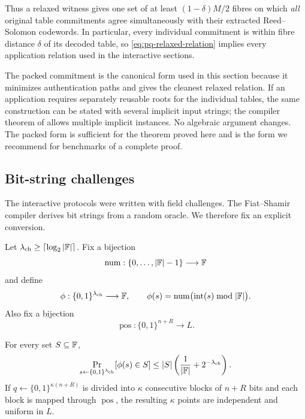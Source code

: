 Thus a relaxed witness gives one set of at least $(1-\delta)M/2$ fibres on which \emph{all} original table commitments agree simultaneously with their extracted Reed--Solomon codewords.  In particular, every individual commitment is within fibre distance $\delta$ of its decoded table, so \cref{eq:pq-relaxed-relation} implies every application relation used in the interactive sections.

\begin{remark}
\label{rem:pq-separate-roots}
The packed commitment is the canonical form used in this section because it minimizes authentication paths and gives the cleanest relaxed relation.  If an application requires separately reusable roots for the individual tables, the same construction can be stated with several implicit input strings; the compiler theorem of \cite{CDHZ25} allows multiple implicit instances.  No algebraic argument changes.  The packed form is sufficient for the theorem proved here and is the form we recommend for benchmarks of a complete proof.
\end{remark}

\subsection{Bit-string challenges}
\label{sec:pq-bit-challenges}

The interactive protocols were written with field challenges.  The Fiat--Shamir compiler derives bit strings from a random oracle.  We therefore fix an explicit conversion.

Let $\lambda_{\mathrm{ch}}\ge \lceil\log_2|\mathbb{F}|\rceil$.  Fix a bijection
\[
  \operatorname{num}:\{0,\ldots,|\mathbb{F}|-1\}\longrightarrow\mathbb{F}
\]
and define
\[
  \phi:\{0,1\}^{\lambda_{\mathrm{ch}}}\longrightarrow\mathbb{F},
  \qquad
  \phi(s)=\operatorname{num}\bigl(\operatorname{int}(s)\bmod|\mathbb{F}|\bigr).
\]
Also fix a bijection
\[
  \operatorname{pos}:\{0,1\}^{n+R}\longrightarrow L.
\]

\begin{lemma}
\label{lem:pq-sampling}
For every set $S\subseteq\mathbb{F}$,
\begin{equation}
  \Pr_{s\leftarrow\{0,1\}^{\lambda_{\mathrm{ch}}}}
  [\phi(s)\in S]
  \le
  |S|\left(\frac1{|\mathbb{F}|}+2^{-\lambda_{\mathrm{ch}}}\right).
  \label{eq:pq-field-sampling}
\end{equation}
If $q\leftarrow\{0,1\}^{\kappa(n+R)}$ is divided into $\kappa$ consecutive blocks of $n+R$ bits and each block is mapped through $\operatorname{pos}$, the resulting $\kappa$ points are independent and uniform in $L$.
\end{lemma}

